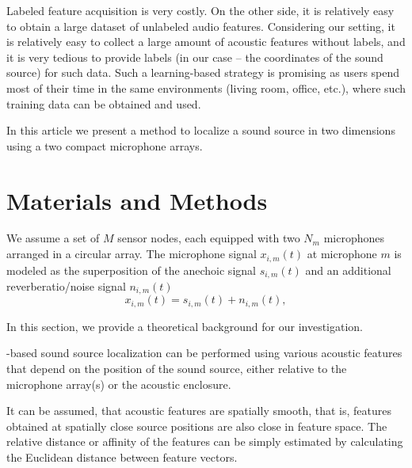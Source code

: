 \documentclass[applsci,article,submit,moreauthors,pdftex]{Definitions/mdpi}
\begin{document}
Labeled feature acquisition is very costly.
On the other side, it is relatively easy to obtain a large dataset of unlabeled audio features. 
Considering our setting, it is relatively easy to collect a large amount of acoustic features without labels, and it is very tedious to provide labels (in our case -- the coordinates of the sound source) for such data. Such a learning-based strategy is promising as users spend most of their time in the same environments (living room, office, etc.), where such training data can be obtained and used.


In this article we present a method to localize a sound source in two dimensions using a two compact microphone arrays. 

\section{Materials and Methods}

\noindent\makebox[\linewidth]{\rule{\paperwidth}{0.4pt}}
We assume a set of $ M $ sensor nodes, each equipped with two $ N_m $ microphones arranged in a circular array.
The microphone signal $ x_{i,m}(t) $ at microphone $ m $ is modeled as the superposition of the anechoic signal $ s_{i,m}(t) $ and an additional reverberatio/noise signal $ n_{i,m}(t) $
\begin{equation}
    x_{i,m}(t) = s_{i,m}(t) + n_{i,m}(t), 
\end{equation}

\noindent\makebox[\linewidth]{\rule{\paperwidth}{0.4pt}}

In this section, we provide a theoretical background for our investigation.

\ann{}-based sound source localization can be performed using various acoustic features that depend on the position of the sound source, either relative to the microphone array(s) or the acoustic enclosure.

It can be assumed, that acoustic features are spatially smooth, that is, features obtained at spatially close source positions are also close in feature space. The relative distance or affinity of the features can be simply estimated by calculating the Euclidean distance between feature vectors. 
\end{document}
